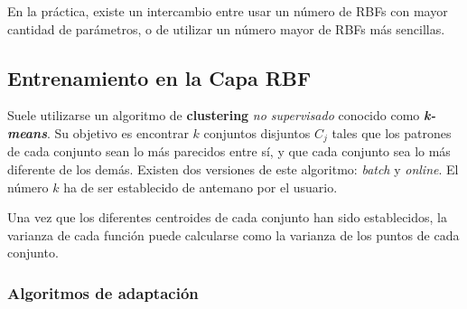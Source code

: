 \documentclass[10pt,a4paper]{article}
\begin{document}
En la práctica, existe un intercambio entre usar un número de RBFs con mayor cantidad de parámetros, o de utilizar un número mayor de RBFs más sencillas.

\subsection{Entrenamiento en la Capa RBF}

Suele utilizarse un algoritmo de \textbf{clustering} \textit{no supervisado} conocido como \textbf{\textit{k-means}}. Su objetivo es encontrar $k$ conjuntos disjuntos $C_j$ tales que los patrones de cada conjunto sean lo más parecidos entre sí, y que cada conjunto  sea lo más diferente de los demás. Existen dos versiones de este algoritmo: \textit{batch} y \textit{online}. El número $k$ ha de ser establecido de antemano por el usuario.

Una vez que los diferentes centroides de cada conjunto han sido establecidos, la varianza de cada función puede calcularse como la varianza de los puntos de cada conjunto.

\subsubsection{Algoritmos de adaptación}
\end{document}
